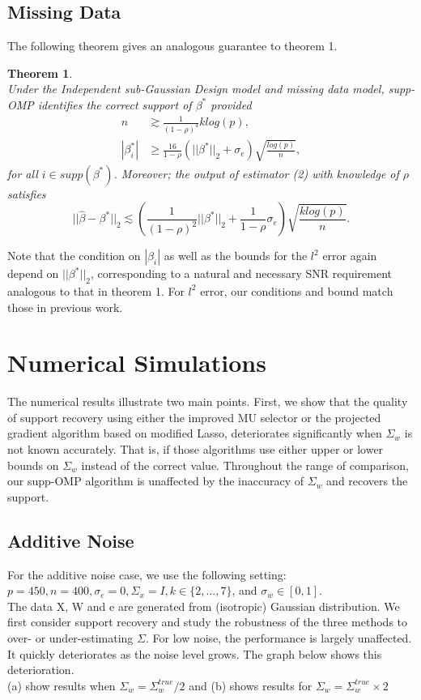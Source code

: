 \documentclass[a4paper,10pt]{article}
\newtheorem{theorem}{Theorem}
\theoremstyle{definition}
\begin{document}
\subsection{Missing Data}

The following theorem gives an analogous guarantee to theorem 1.

\begin{theorem}\ \\
	Under the Independent sub-Gaussian Design model and missing data model, supp-OMP identifies the correct support of $\beta^*$ provided
	\begin{align*}
		n &\gtrsim \frac{1}{(1-\rho)^4}k log(p),\\
		|\beta^*_i| &\geq \frac{16}{1-\rho}(||\beta^*||_2 + \sigma_e) \sqrt{\frac{log(p)}{n}},
	\end{align*}
	for all $i \in supp(\beta^*)$. Moreover; the output of estimator (2) with knowledge of $\rho$ satisfies
	\begin{equation*}
		||\hat{\beta} - \beta^*||_2 \lesssim (\frac{1}{(1-\rho)^2}||\beta^*||_2 + \frac{1}{1-\rho}\sigma_e)\sqrt{\frac{k log(p)}{n}}.
	\end{equation*}
\end{theorem}

Note that the condition on $|\beta_i|$ as well as the bounds for the $l^2$ error again depend on $||\beta^*||_2$, corresponding to a natural and necessary SNR requirement analogous to that in theorem 1. For $l^2$ error, our conditions and bound match those in previous work.



\section{Numerical Simulations}

The numerical results illustrate two main points. First, we show that the quality of support recovery using either the improved MU selector or the projected gradient algorithm based on modified Lasso, deteriorates significantly when $\Sigma_w$ is not known accurately. That is, if those algorithms use either upper or lower bounds on $\Sigma_w$ instead of the correct value. Throughout the range of comparison, our supp-OMP algorithm is unaffected by the inaccuracy of $\Sigma_w$ and recovers the support.

\subsection{Additive Noise}
For the additive noise case, we use the following setting:\\
$p=450, n=400, \sigma_e=0, \Sigma_x = I,k\in \{2,...,7\}$, and $\sigma_w \in [0,1]$.\\
The data X, W and e are generated from (isotropic) Gaussian distribution. We first consider support recovery and study the robustness of the three methods to over- or under-estimating $\Sigma$. For low noise, the performance is largely unaffected. It quickly deteriorates as the noise level grows. The graph below shows this deterioration.\\
(a) show results when $\Sigma_w = \Sigma^{true}_w/ 2$ and (b) shows results for $\Sigma_w = \Sigma^{true}_w\times 2$
\end{document}
